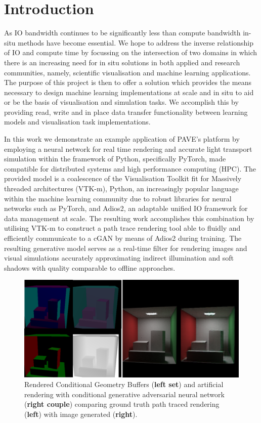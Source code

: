 \documentclass[conference]{IEEEtran}
\begin{document}
\section{Introduction}
As IO bandwidth continues to be significantly less than compute bandwidth in-situ methods have become essential. We hope to address the inverse relationship of IO and compute time by focussing on the intersection of two domains in which there is an increasing need for in situ solutions in both applied and research communities, namely, scientific visualisation and machine learning applications. The purpose of this project is then to offer a solution which provides the means necessary to design machine learning implementations at scale and in situ to aid or be the basis of visualisation and simulation tasks. We accomplish this by providing read, write and in place data transfer functionality between learning models and visualisation task implementations. 

In this work we demonstrate an example application of PAVE's platform by employing a neural network for real time rendering and accurate light transport simulation within the framework of Python, specifically PyTorch, made compatible for distributed systems and high performance computing (HPC). The provided model is a coalescence of the Visualisation Toolkit fit for Massively threaded architectures (VTK-m), Python, an increasingly popular language within the machine learning community due to robust libraries for neural networks such as PyTorch, and Adios2, an adaptable unified IO framework for data management at scale. The resulting work accomplishes this combination by utilising VTK-m to construct a path trace rendering tool able to fluidly and efficiently communicate to a cGAN by means of Adios2 during training.   The resulting generative model serves as a real-time filter for rendering images and visual simulations accurately approximating indirect illumination and soft shadows with quality comparable to offline approaches. 

\begin{figure}
    \includegraphics[width=\linewidth]{buffer_results_teaser}
    \caption{Rendered Conditional Geometry Buffers ({\bf left set}) and artificial rendering with conditional generative adversarial neural network ({\bf right couple}) comparing ground truth path traced rendering ({\bf left}) with image generated ({\bf right}).}
  \end{figure}
\end{document}
